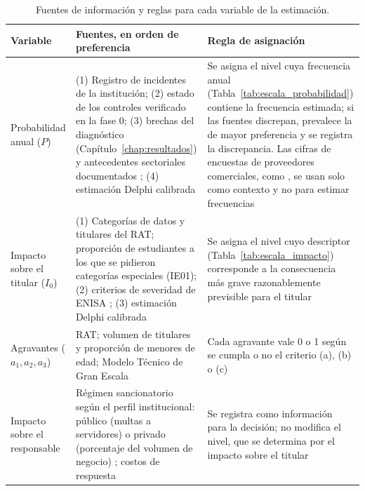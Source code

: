 \begin{table}[htbp]
  \centering
  \caption{Fuentes de información y reglas para cada variable de la estimación.}
  \label{tab:fuentes_estimacion}
  \scriptsize
  \renewcommand{\arraystretch}{1.2}
  \begin{tabularx}{\textwidth}{|>{\raggedright\arraybackslash}p{2.4cm}|L|L|}
    \hline
    \textbf{Variable} & \textbf{Fuentes, en orden de preferencia} & \textbf{Regla de asignación} \\
    \hline
    Probabilidad anual ($P$) & (1) Registro de incidentes de la institución; (2) estado de los controles verificado en la fase 0; (3) brechas del diagnóstico (Capítulo~\ref{chap:resultados}) y antecedentes sectoriales documentados \cite{ulven2021systematic,li2023breach}; (4) estimación Delphi calibrada & Se asigna el nivel cuya frecuencia anual (Tabla~\ref{tab:escala_probabilidad}) contiene la frecuencia estimada; si las fuentes discrepan, prevalece la de mayor preferencia y se registra la discrepancia. Las cifras de encuestas de proveedores comerciales, como \cite{sophos2024education}, se usan solo como contexto y no para estimar frecuencias \\
    \hline
    Impacto sobre el titular ($I_0$) & (1) Categorías de datos y titulares del RAT; proporción de estudiantes a los que se pidieron categorías especiales (IE01); (2) criterios de severidad de ENISA \cite{enisa2013severity}; (3) estimación Delphi calibrada & Se asigna el nivel cuyo descriptor (Tabla~\ref{tab:escala_impacto}) corresponde a la consecuencia más grave razonablemente previsible para el titular \\
    \hline
    Agravantes ($a_1, a_2, a_3$) & RAT; volumen de titulares y proporción de menores de edad; Modelo Técnico de Gran Escala \cite{spdp2026granescala} & Cada agravante vale 0 o 1 según se cumpla o no el criterio (a), (b) o (c) \\
    \hline
    Impacto sobre el responsable & Régimen sancionatorio según el perfil institucional: público (multas a servidores) o privado (porcentaje del volumen de negocio) \cite[arts.~71 y 72]{lopdp2021}; costos de respuesta & Se registra como información para la decisión; no modifica el nivel, que se determina por el impacto sobre el titular \\
    \hline
  \end{tabularx}
  \raggedright
\end{table}

